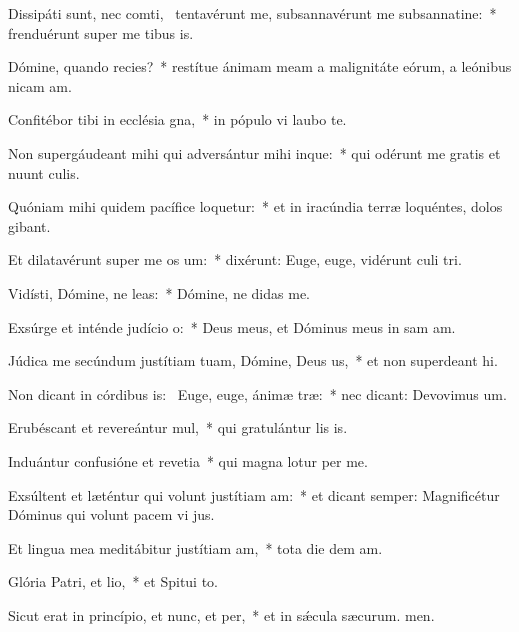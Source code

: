 \item Dissipáti sunt, nec comti,~\pscross{} tentavérunt me, subsannavérunt me subsannatine:~* frenduérunt super me tibus is.
\item Dómine, quando recies?~* restítue ánimam meam a malignitáte eórum, a leónibus nicam am.
\item Confitébor tibi in ecclésia gna,~* in pópulo vi laubo te.
\item Non supergáudeant mihi qui adversántur mihi inque:~* qui odérunt me gratis et nuunt culis.
\item Quóniam mihi quidem pacífice loquetur:~* et in iracúndia terræ loquéntes, dolos gibant.
\item Et dilatavérunt super me os um:~* dixérunt: Euge, euge, vidérunt culi tri.
\item Vidísti, Dómine, ne leas:~* Dómine, ne didas  me.
\item Exsúrge et inténde judício o:~* Deus meus, et Dóminus meus in sam am.
\item Júdica me secúndum justítiam tuam, Dómine, Deus us,~* et non superdeant hi.
\item Non dicant in córdibus is:~\pscross{} Euge, euge, ánimæ træ:~* nec dicant: Devovimus um.
\item Erubéscant et revereántur mul,~* qui gratulántur lis is.
\item Induántur confusióne et revetia~* qui magna lotur per me.
\item Exsúltent et læténtur qui volunt justítiam am:~* et dicant semper: Magnificétur Dóminus qui volunt pacem vi jus.
\item Et lingua mea meditábitur justítiam am,~* tota die dem am.
\item Glória Patri, et lio,~* et Spitui to.
\item Sicut erat in princípio, et nunc, et per,~* et in sǽcula sæcurum. men.
